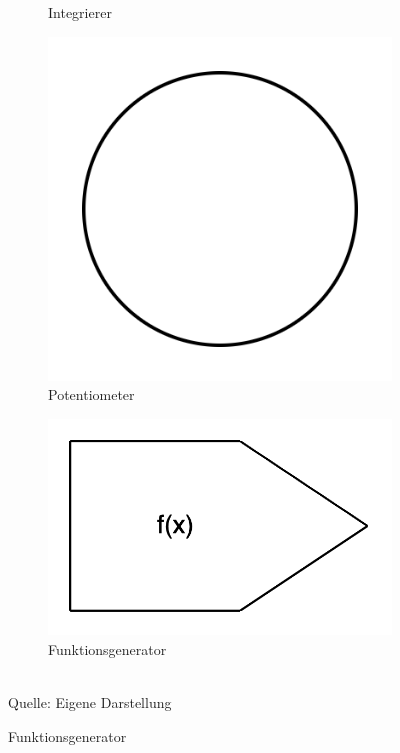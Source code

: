 \begin{figure}[h]
\begin{subfigure}[b]{0.2\textwidth}
    \caption{Integrierer}
  \end{subfigure}%
  \hfill
  \begin{subfigure}[b]{0.2\textwidth}
    \includegraphics[width=\textwidth]{abbildungen/symbol_potentiometer.png}
    \caption{Potentiometer}
  \end{subfigure}%
  \hfill
  \begin{subfigure}[b]{0.2\textwidth}
    \includegraphics[width=\textwidth]{abbildungen/symbol_funktionsgenerator.png}
    \caption{Funktionsgenerator}
  \end{subfigure}
  \\
  Quelle: Eigene Darstellung
\end{figure}

